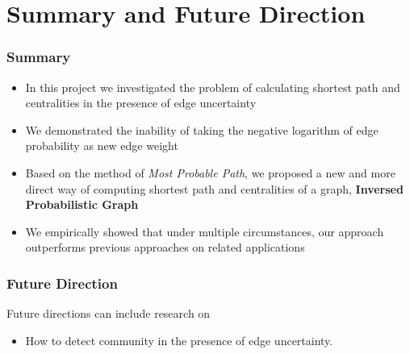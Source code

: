\documentclass[9pt]{beamer}
\begin{document}
\section{Summary and Future Direction}
\begin{frame}
\frametitle{Summary}
\begin{itemize}
\item In this project we investigated the problem of calculating shortest path and centralities in the presence of edge uncertainty
\item We demonstrated the inability of taking the negative logarithm of edge probability as new edge weight
\item Based on the method of \textit{Most Probable Path}, we proposed a new and more direct way of computing shortest path and centralities of a graph, \textbf{Inversed Probabilistic Graph}
\item We empirically showed that under multiple circumstances, our approach outperforms previous approaches on related applications
\end{itemize}
\end{frame}

\begin{frame}
\frametitle{Future Direction}
Future directions can include research on
\begin{itemize}
\item How to detect community in the presence of edge uncertainty.
\end{itemize}
\end{frame}




\end{document}
